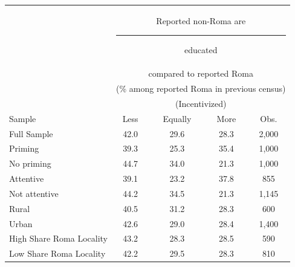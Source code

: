 \begin{tabular}{lcccc}
\toprule
\addlinespace
& \multicolumn{4}{c}{Reported non-Roma are \rule[-0.5ex]{2em}{0.5pt} educated} \\
& \multicolumn{4}{c}{compared to reported Roma} \\
& \multicolumn{4}{c}{(\% among reported Roma in previous census)} \\
& \multicolumn{4}{c}{(Incentivized)} \\
\addlinespace
Sample & Less & Equally & More & Obs. \\
\midrule
\addlinespace
Full Sample & 42.0 & 29.6 & 28.3 & 2,000 \\
\addlinespace
Priming & 39.3 & 25.3 & 35.4 & 1,000 \\
No priming & 44.7 & 34.0 & 21.3 & 1,000 \\
\addlinespace
Attentive & 39.1 & 23.2 & 37.8 & 855 \\
Not attentive & 44.2 & 34.5 & 21.3 & 1,145 \\
\addlinespace
Rural & 40.5 & 31.2 & 28.3 & 600 \\
Urban & 42.6 & 29.0 & 28.4 & 1,400 \\
\addlinespace
High Share Roma Locality & 43.2 & 28.3 & 28.5 & 590 \\
Low Share Roma Locality & 42.2 & 29.5 & 28.3 & 810 \\
\bottomrule
\end{tabular}
